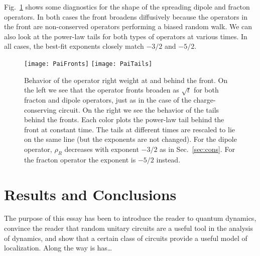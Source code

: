 \documentclass[a4paper,12pt]{article}
\begin{document}
Fig.~\ref{fig:PaiTails} shows some diagnostics for the shape of the spreading dipole and fracton operators. In both cases the front broadens diffusively because the operators in the front are non-conserved operators performing a biased random walk. We can also look at the power-law tails for both types of operators at various times. In all cases, the best-fit exponents closely match $-3/2$ and $-5/2$.
\begin{figure}
	\centering
	\texttt{[image: PaiFronts]}
	\texttt{[image: PaiTails]}
	\caption{Behavior of the operator right weight at and behind the front. 
		On the left we see that the operator fronts broaden as $\sqrt{t}$ for both fracton and dipole operators, just as in the case of the charge-conserving circuit.
		On the right we see the behavior of the tails behind the fronts. Each color plots the power-law tail behind the front at constant time. The tails at different times are rescaled to lie on the same line (but the exponents are not changed). For the dipole operator, $\rho_R$ decreases with exponent $-3/2$ as in Sec.~\ref{sec:cons}. For the fracton operator the exponent is $-5/2$ instead. }
	\label{fig:PaiTails}
\end{figure}


\section{Results and Conclusions} \label{sec:conc}

The purpose of this essay has been to introduce the reader to quantum dynamics, convince the reader that random unitary circuits are a useful tool in the analysis of dynamics, and show that a certain class of circuits provide a useful model of localization. Along the way is has\dots


\nocite{apsrev41Control}

\end{document}
